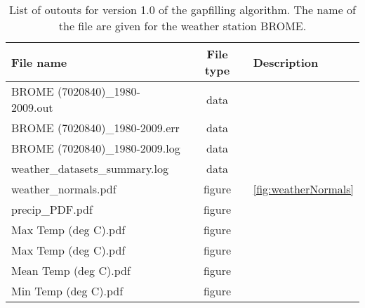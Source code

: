 \documentclass[ARTICLETHERMIC.tex]{subfiles}
\begin{document}
\begin{table}[!h]
    \centering
    \caption{List of outouts for version 1.0 of the gapfilling algorithm. The name of the file are given for the weather station BROME.}
    \begin{tabular}{lcp{8.5cm}}
        \toprule
        File name & File type & Description\\
        \midrule
        BROME (7020840)\_1980-2009.out & data & \\[1em]
        BROME (7020840)\_1980-2009.err & data & \\[1em]
        BROME (7020840)\_1980-2009.log & data & \\[1em]  
        weather\_datasets\_summary.log & data & \\[1em]       
        weather\_normals.pdf & figure & \cref{fig:weatherNormals} \\[1em]
        precip\_PDF.pdf  & figure & \\[1em]
        Max Temp (deg C).pdf & figure & \\[1em]
        Max Temp (deg C).pdf & figure & \\[1em]
        Mean Temp (deg C).pdf & figure & \\[1em]
        Min Temp (deg C).pdf & figure & \\
        \bottomrule
    \end{tabular}
    \label{tab:output_files}
\end{table}
\end{document}
